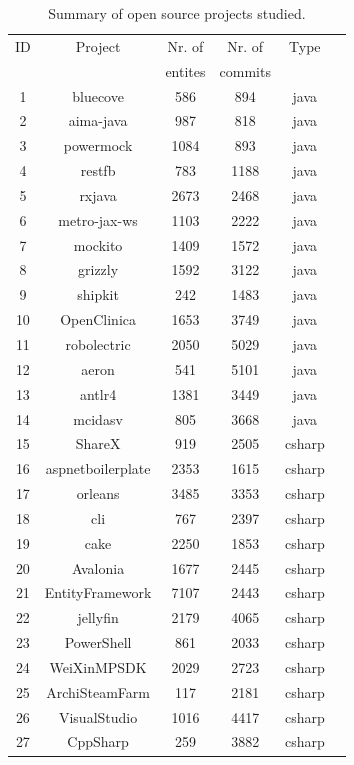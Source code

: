 \documentclass[12pt]{mitthesis}
\begin{document}
\begin{table}[H]
\caption{Summary of open source projects studied.}
\label{table:1}
\centering
\begin{tabular}{|c|c|c|c|c|c|}
\hline
   ID  & Project    & Nr. of & Nr. of& Type\\
     &     & entites & commits & \\
\hline
1	&	bluecove	&	586	&	894	&	java	\\
2	&	aima-java	&	987	&	818	&	java	\\
3	&	powermock	&	1084	&	893	&	java	\\
4	&	restfb	&	783	&	1188	&	java	\\
5	&	rxjava	&	2673	&	2468	&	java	\\
6	&	metro-jax-ws	&	1103	&	2222	&	java	\\
7	&	mockito	&	1409	&	1572	&	java	\\
8	&	grizzly	&	1592	&	3122	&	java	\\
9	&	shipkit	&	242	&	1483	&	java	\\
10	&	OpenClinica	&	1653	&	3749	&	java	\\
11	&	robolectric	&	2050	&	5029	&	java	\\
12	&	aeron	&	541	&	5101	&	java	\\
13	&	antlr4	&	1381	&	3449	&	java	\\
14	&	mcidasv	&	805	&	3668	&	java	\\
15	&	ShareX	&	919	&	2505	&	csharp	\\
16	&	aspnetboilerplate	&	2353	&	1615	&	csharp	\\
17	&	orleans	&	3485	&	3353	&	csharp	\\
18	&	cli	&	767	&	2397	&	csharp	\\
19	&	cake	&	2250	&	1853	&	csharp	\\
20	&	Avalonia	&	1677	&	2445	&	csharp	\\
21	&	EntityFramework	&	7107	&	2443	&	csharp	\\
22	&	jellyfin	&	2179	&	4065	&	csharp	\\
23	&	PowerShell	&	861	&	2033	&	csharp	\\
24	&	WeiXinMPSDK	&	2029	&	2723	&	csharp	\\
25	&	ArchiSteamFarm	&	117	&	2181	&	csharp	\\
26	&	VisualStudio	&	1016	&	4417	&	csharp	\\
27	&	CppSharp	&	259	&	3882	&	csharp	\\
\hline
\end{tabular}
\end{table}
\end{document}
